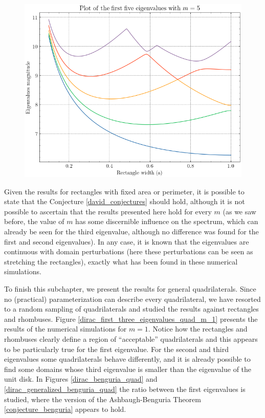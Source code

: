 \begin{figure}[!htb]
\begin{minipage}{.5\textwidth}
      \includegraphics[width=1\linewidth]{Images/Dirac/quad/eigenvalues_rectangle_perimeter_width_m_5.png}
      \captionsetup{width=0.9\linewidth} %
      \label{eigenvalues_rectangle_perimeter_width_m_5}
    \end{minipage}
\end{figure}

Given the results for rectangles with fixed area or perimeter, it is possible to state that the Conjecture \ref{david_conjectures} should hold, although it is not possible to ascertain that the results presented here hold for every \(m\) (as we saw before, the value of \(m\) has some discernible influence on the spectrum, which can already be seen for the third eigenvalue, although no difference was found for the first and second eigenvalues). In any case, it is known that the eigenvalues are continuous with domain perturbations (here these perturbations can be seen as stretching the rectangles), exactly what has been found in these numerical simulations.

To finish this subchapter, we present the results for general quadrilaterals. Since no (practical) parameterization can describe every quadrilateral, we have resorted to a random sampling of quadrilaterals and studied the results against rectangles and rhombuses. Figure \ref{dirac_first_three_eigenvalues_quad_m_1} presents the results of the numerical simulations for \(m=1\). Notice how the rectangles and rhombuses clearly define a region of ``acceptable'' quadrilaterals and this appears to be particularly true for the first eigenvalue. For the second and third eigenvalues some quadrilaterals behave differently, and it is already possible to find some domains whose third eigenvalue is smaller than the eigenvalue of the unit disk. In Figures \ref{dirac_benguria_quad} and \ref{dirac_generalized_benguria_quad} the ratio between the first eigenvalues is studied, where the version of the Ashbaugh-Benguria Theorem \ref{conjecture_benguria} appears to hold.

